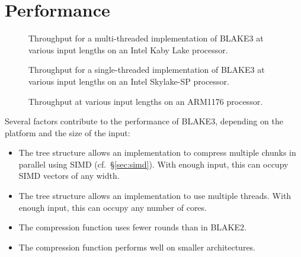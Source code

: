 \documentclass[11pt,notitlepage,a4paper]{article}
\begin{document}
\section{Performance}\label{sec:performance}

\begin{figure}[h]
\centering
%

\caption{Throughput for a multi-threaded implementation of BLAKE3 at various
    input lengths on an Intel Kaby Lake processor.}
\label{fig:avx2_rayon}
\end{figure}

\begin{figure}[h]
\centering
%

\caption{Throughput for a single-threaded implementation of BLAKE3 at various
    input lengths on an Intel Skylake-SP processor.}%
\label{fig:avx512_c}
\end{figure}

\begin{figure}[h]
\centering
%

\caption{Throughput at various input lengths on an ARM1176 processor.}%
\label{fig:rpizero}
\end{figure}

Several factors contribute to the performance of BLAKE3, depending on the
platform and the size of the input:

\begin{itemize}
    \item The tree structure allows an implementation to compress multiple
        chunks in parallel using SIMD (cf.~\S\ref{sec:simd}). With enough
        input, this can occupy SIMD vectors of any width.
    \item The tree structure allows an implementation to use multiple threads.
        With enough input, this can occupy any number of cores.
    \item The compression function uses fewer rounds than in BLAKE2.
    \item The compression function performs well on smaller architectures.
\end{itemize}
\end{document}
